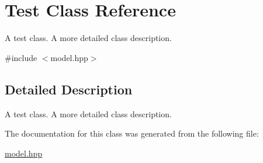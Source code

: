 \hypertarget{classTest}{}\section{Test Class Reference}
\label{classTest}


A test class. A more detailed class description.  




{\ttfamily \#include $<$model.\+hpp$>$}



\subsection{Detailed Description}
A test class. A more detailed class description. 

The documentation for this class was generated from the following file\+:\begin{DoxyCompactItemize}
\item 
\hyperlink{model_8hpp}{model.\+hpp}\end{DoxyCompactItemize}
